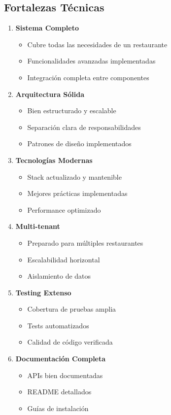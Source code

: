 \documentclass[12pt,a4paper]{article}
\begin{document}
\subsection{Fortalezas Técnicas}

\begin{enumerate}
    \item \textbf{Sistema Completo}
    \begin{itemize}
        \item Cubre todas las necesidades de un restaurante
        \item Funcionalidades avanzadas implementadas
        \item Integración completa entre componentes
    \end{itemize}
    
    \item \textbf{Arquitectura Sólida}
    \begin{itemize}
        \item Bien estructurado y escalable
        \item Separación clara de responsabilidades
        \item Patrones de diseño implementados
    \end{itemize}
    
    \item \textbf{Tecnologías Modernas}
    \begin{itemize}
        \item Stack actualizado y mantenible
        \item Mejores prácticas implementadas
        \item Performance optimizado
    \end{itemize}
    
    \item \textbf{Multi-tenant}
    \begin{itemize}
        \item Preparado para múltiples restaurantes
        \item Escalabilidad horizontal
        \item Aislamiento de datos
    \end{itemize}
    
    \item \textbf{Testing Extenso}
    \begin{itemize}
        \item Cobertura de pruebas amplia
        \item Tests automatizados
        \item Calidad de código verificada
    \end{itemize}
    
    \item \textbf{Documentación Completa}
    \begin{itemize}
        \item APIs bien documentadas
        \item README detallados
        \item Guías de instalación
    \end{itemize}
\end{enumerate}
\end{document}

